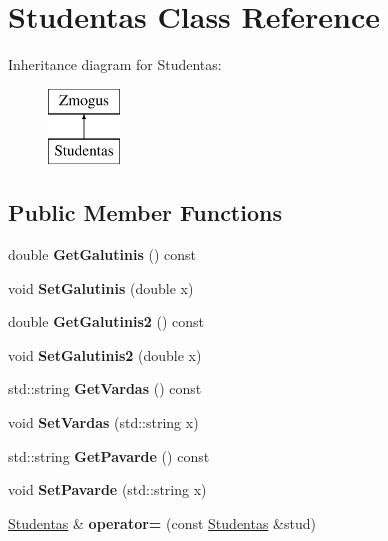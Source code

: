 \hypertarget{class_studentas}{}\section{Studentas Class Reference}
\label{class_studentas}
Inheritance diagram for Studentas\+:\begin{figure}[H]
\begin{center}
\leavevmode
\includegraphics[height=2.000000cm]{class_studentas}
\end{center}
\end{figure}
\subsection*{Public Member Functions}
\begin{DoxyCompactItemize}
\item 
\mbox{\label{class_studentas_a608a3ed5f700fe43bff4556db31e4eae}} 
double {\bfseries Get\+Galutinis} () const
\item 
\mbox{\label{class_studentas_a99eea7cb6d09ff04c8bcd83a63bc2d16}} 
void {\bfseries Set\+Galutinis} (double x)
\item 
\mbox{\label{class_studentas_ac9a3b5dc3fee13ecdff9277803de467c}} 
double {\bfseries Get\+Galutinis2} () const
\item 
\mbox{\label{class_studentas_a2f23d9ea64cc33184861f45bacb06ca5}} 
void {\bfseries Set\+Galutinis2} (double x)
\item 
\mbox{\label{class_studentas_aeefbcc24027344ebee9a37021712a1cf}} 
std\+::string {\bfseries Get\+Vardas} () const
\item 
\mbox{\label{class_studentas_adbb68a13167e2a2f048743617a908f25}} 
void {\bfseries Set\+Vardas} (std\+::string x)
\item 
\mbox{\label{class_studentas_a9651a1c3dcc8103326fd75cbfc7774ec}} 
std\+::string {\bfseries Get\+Pavarde} () const
\item 
\mbox{\label{class_studentas_aa797f7a2b855979ff11459ad010e9050}} 
void {\bfseries Set\+Pavarde} (std\+::string x)
\item 
\mbox{\label{class_studentas_ae8b7c23858a5af9a1114940982056602}} 
\mbox{\hyperlink{class_studentas}{Studentas}} \& {\bfseries operator=} (const \mbox{\hyperlink{class_studentas}{Studentas}} \&stud)
\end{DoxyCompactItemize}
